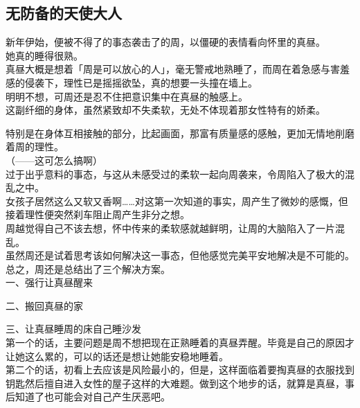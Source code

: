 \subsection{无防备的天使大人}

新年伊始，便被不得了的事态袭击了的周，以僵硬的表情看向怀里的真昼。\\

她真的睡得很熟。\\

真昼大概是想着「周是可以放心的人」，毫无警戒地熟睡了，而周在着急感与害羞感的侵袭下，理性已是摇摇欲坠，真的想要一头撞在墙上。\\

明明不想，可周还是忍不住把意识集中在真昼的触感上。\\

这副纤细的身体，虽然紧致却不失柔软，无处不体现着那女性特有的娇柔。

特别是在身体互相接触的部分，比起画面，那富有质量感的感触，更加无情地削磨着周的理性。\\

（——这可怎么搞啊）\\

过于出乎意料的事态，与这从未感受过的柔软一起向周袭来，令周陷入了极大的混乱之中。\\

女孩子居然这么又软又香啊……对这第一次知道的事实，周产生了微妙的感慨，但接着理性便突然刹车阻止周产生非分之想。\\

周越觉得自己不该去想，怀中传来的柔软感就越鲜明，让周的大脑陷入了一片混乱。\\

虽然周还是试着思考该如何解决这一事态，但他感觉完美平安地解决是不可能的。\\

总之，周还是总结出了三个解决方案。\\

一、强行让真昼醒来

二、搬回真昼的家

三、让真昼睡周的床自己睡沙发\\

第一个的话，主要问题是周不想把现在正熟睡着的真昼弄醒。毕竟是自己的原因才让她这么累的，可以的话还是想让她能安稳地睡着。\\

第二个的话，初看上去应该是风险最小的，但是，这样面临着要掏真昼的衣服找到钥匙然后擅自进入女性的屋子这样的大难题。做到这个地步的话，就算是真昼，事后知道了也可能会对自己产生厌恶吧。\\

